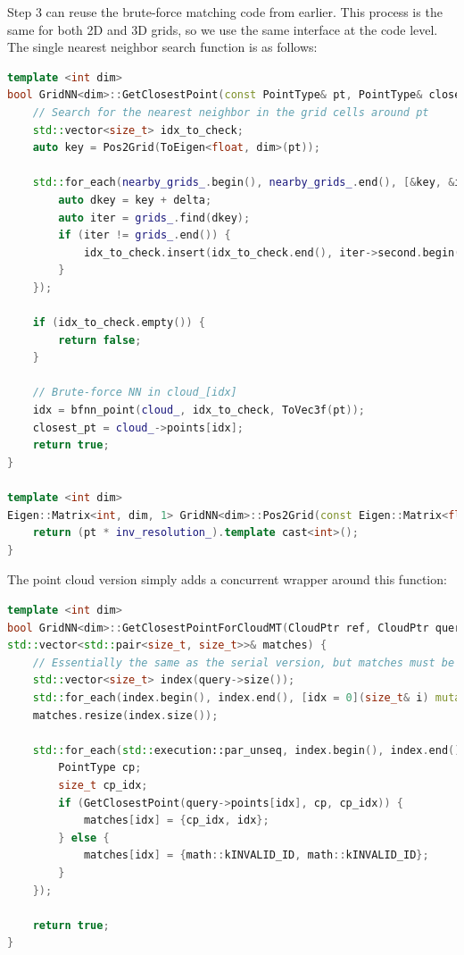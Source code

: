 Step 3 can reuse the brute-force matching code from earlier. This process is the same for both 2D and 3D grids, so we use the same interface at the code level. The single nearest neighbor search function is as follows:

\begin{lstlisting}[language=c++,caption=src/ch5/gridnn.hpp]
template <int dim>
bool GridNN<dim>::GetClosestPoint(const PointType& pt, PointType& closest_pt, size_t& idx) {
	// Search for the nearest neighbor in the grid cells around pt
	std::vector<size_t> idx_to_check;
	auto key = Pos2Grid(ToEigen<float, dim>(pt));
	
	std::for_each(nearby_grids_.begin(), nearby_grids_.end(), [&key, &idx_to_check, this](const KeyType& delta) {
		auto dkey = key + delta;
		auto iter = grids_.find(dkey);
		if (iter != grids_.end()) {
			idx_to_check.insert(idx_to_check.end(), iter->second.begin(), iter->second.end());
		}
	});
	
	if (idx_to_check.empty()) {
		return false;
	}
	
	// Brute-force NN in cloud_[idx]
	idx = bfnn_point(cloud_, idx_to_check, ToVec3f(pt));
	closest_pt = cloud_->points[idx];
	return true;
}

template <int dim>
Eigen::Matrix<int, dim, 1> GridNN<dim>::Pos2Grid(const Eigen::Matrix<float, dim, 1>& pt) {
	return (pt * inv_resolution_).template cast<int>();
}
\end{lstlisting}

The point cloud version simply adds a concurrent wrapper around this function:
\begin{lstlisting}[language=c++,caption=src/ch5/gridnn.hpp]
template <int dim>
bool GridNN<dim>::GetClosestPointForCloudMT(CloudPtr ref, CloudPtr query,
std::vector<std::pair<size_t, size_t>>& matches) {
	// Essentially the same as the serial version, but matches must be preallocated, with invalid matches filled on failure
	std::vector<size_t> index(query->size());
	std::for_each(index.begin(), index.end(), [idx = 0](size_t& i) mutable { i = idx++; });
	matches.resize(index.size());
	
	std::for_each(std::execution::par_unseq, index.begin(), index.end(), [this, &matches, &query](const size_t& idx) {
		PointType cp;
		size_t cp_idx;
		if (GetClosestPoint(query->points[idx], cp, cp_idx)) {
			matches[idx] = {cp_idx, idx};
		} else {
			matches[idx] = {math::kINVALID_ID, math::kINVALID_ID};
		}
	});
	
	return true;
}
\end{lstlisting}


